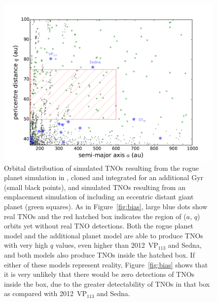 \documentclass[preprint]{aastex62}
\begin{document}
\begin{figure}
\includegraphics[width=\textwidth]{figures/rogue_aq.pdf}
\caption{Orbital distribution of simulated TNOs resulting from the rogue planet simulation in \citet{gladmanchan06}, cloned and integrated for an additional Gyr (small black points), and simulated TNOs resulting from an emplacement simulation of \citet{lawler2017} including an eccentric distant giant planet (green squares).
As in Figure~\ref{fig:bias}, large blue dots show real TNOs and the red hatched box indicates the region of ($a$, $q$) orbits yet without real TNO detections.
Both the rogue planet model and the additional planet model are able to produce TNOs with very high $q$ values, even higher than 2012~VP$_{113}$ and Sedna, and 
both models also produce TNOs inside the hatched box. 
If either of these models represent reality, Figure~\ref{fig:bias} shows that it is very unlikely that there would be zero detections of TNOs inside the box, due to the greater detectability of TNOs in that box as compared with 2012~VP$_{113}$ and Sedna.
}
\label{fig:rogue}
\end{figure}
\end{document}
